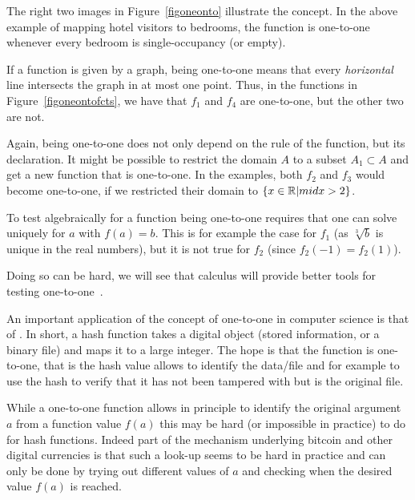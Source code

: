 The right two images in Figure~\ref{figoneonto} illustrate the concept.
In the above example of mapping hotel visitors to bedrooms, the function is one-to-one
whenever every bedroom is single-occupancy (or empty).
\medskip

If a function is given by a graph, being one-to-one means that every {\em horizontal}
line intersects the graph in at most one point. Thus,
in the functions in Figure~\ref{figoneontofcts}, we have that $f_1$ and $f_4$ are
one-to-one, but the other two are not.

Again, being one-to-one does not only depend on the rule of the function, but its
declaration. It might be possible to restrict the domain $A$ to a subset $A_1\subset A$
and get a new function that is one-to-one. In the examples, both $f_2$ and $f_3$ would
become one-to-one, if we restricted their domain to $\{x\in{\mathbb R}|mid x>2\}$.
\medskip

To test algebraically for a function being one-to-one requires that one can solve
uniquely for $a$ with $f(a)=b$. This is for example the case for $f_1$ (as
$\sqrt[3]{b}$ is unique in the real numbers), but it is not true for $f_2$ (since
$f_2(-1)=f_2(1)$).

Doing so can be hard, we will see that calculus will provide better tools
for testing one-to-one~.

An important application of the concept of one-to-one in computer science is
that of . In short, a hash function takes a digital
object (stored information, or a binary file) and maps it to a large
integer. The hope is that the function is one-to-one, that is the hash value allows to
identify the data/file and for example to use the hash to verify that it has
not been tampered with but is the original file.

While a one-to-one function allows in principle to identify the original
argument $a$ from a function value $f(a)$ this may be hard (or impossible in
practice) to do for hash functions. Indeed part of the mechanism underlying
bitcoin and other digital currencies is that such a look-up seems to be hard
in practice and can only be done by trying out different values of $a$ and
checking when the desired value $f(a)$ is reached.
\medskip

